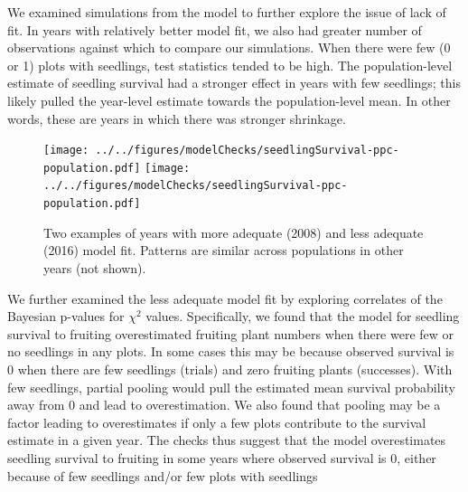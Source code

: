 \documentclass[12pt, oneside, titlepage]{article}   	%
\begin{document}
We examined simulations from the model to further explore the issue of lack of fit. In years with relatively better model fit, we also had greater number of observations against which to compare our simulations. When there were few (0 or 1) plots with seedlings, test statistics tended to be high. The population-level estimate of seedling survival had a stronger effect in years with few seedlings; this likely pulled the year-level estimate towards the population-level mean. In other words, these are years in which there was stronger shrinkage.

\begin{figure}[!h]
   \centering
       \texttt{[image: ../../figures/modelChecks/seedlingSurvival-ppc-population.pdf]}  
       \texttt{[image: ../../figures/modelChecks/seedlingSurvival-ppc-population.pdf]}  
    \caption{ Two examples of years with more adequate (2008) and less adequate (2016) model fit. Patterns are similar across populations in other years (not shown). }
 \label{fig:name}
\end{figure}

We further examined the less adequate model fit by exploring correlates of the Bayesian p-values for $\chi^2$ values. Specifically, we found that the model for seedling survival to fruiting overestimated fruiting plant numbers when there were few or no seedlings in any plots. In some cases this may be because observed survival is 0 when there are few seedlings (trials) and zero fruiting plants (successes). With few seedlings, partial pooling would pull the estimated mean survival probability away from 0 and lead to overestimation. We also found that pooling may be a factor leading to overestimates if only a few plots contribute to the survival estimate in a given year. The checks thus suggest that the model overestimates seedling survival to fruiting in some years where observed survival is 0, either because of few seedlings and/or few plots with seedlings
\end{document}
